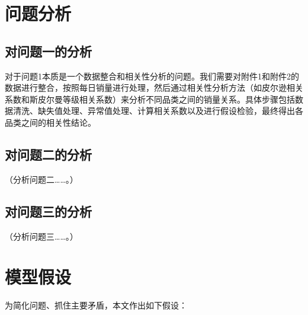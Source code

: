 \documentclass[a4paper, zihao=-4, fontset=windows]{ctexart}
\begin{document}
\section{问题分析}

\subsection{对问题一的分析}

对于问题1本质是一个数据整合和相关性分析的问题。我们需要对附件1和附件2的数据进行整合，按照每日销量进行处理，然后通过相关性分析方法（如皮尔逊相关系数和斯皮尔曼等级相关系数）来分析不同品类之间的销量关系。具体步骤包括数据清洗、缺失值处理、异常值处理、计算相关系数以及进行假设检验，最终得出各品类之间的相关性结论。

\subsection{对问题二的分析}

（分析问题二……。）

\subsection{对问题三的分析}

（分析问题三……。）

\section{模型假设}

为简化问题、抓住主要矛盾，本文作出如下假设：
\end{document}
